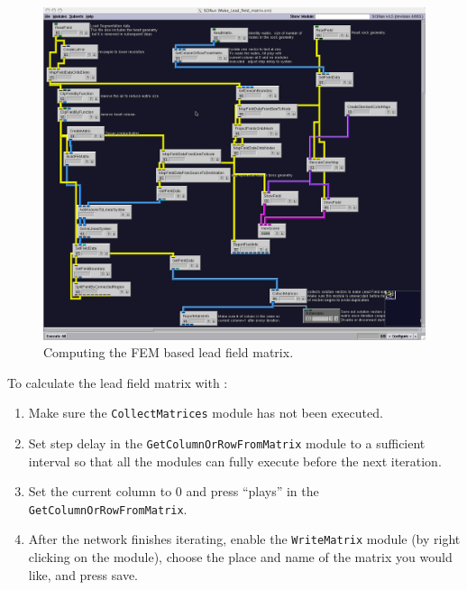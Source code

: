\documentclass[fleqn,11pt,openany]{book}
\begin{document}
\begin{figure}[H]
\begin{center}
\includegraphics[width=\textwidth]{ECGToolkitGuide_figures/leadfield_pot_fem.png}
\caption{Computing the FEM based lead field matrix.}
\label{fig:mat_pot_fem}
\end{center}
\end{figure}

To calculate the lead field matrix with
\newline {}:
\begin{enumerate}
\item{Make sure the {\tt CollectMatrices} module has not been executed.}
\item{Set step delay in the {\tt GetColumnOrRowFromMatrix} module to a sufficient interval so
that all the modules can fully execute before the next iteration.}
\item{Set the current column to 0 and press ``plays'' in the {\tt GetColumnOrRowFromMatrix}.}
\item{After the network finishes iterating, enable the {\tt WriteMatrix} module (by right clicking on
the module), choose the place and name of the matrix you would like, and press save.  }
\end{enumerate}
\end{document}
